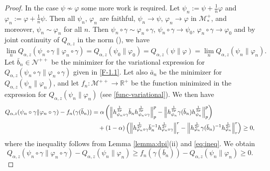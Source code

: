 \documentclass[12pt]{article}
\theoremstyle{definition}
\theoremstyle{remark}
\numberwithin{equation}{section}
\def\Me{\mathcal M}
\def\Ne{\mathcal N}
\def\ffi{\varphi}
\begin{document}
\begin{proof}
In the case $\psi\not\sim \ffi$ some more work is required. Let $\psi_n:=\psi+\frac1n \ffi$ and
$\ffi_n:=\ffi+\frac1n \psi$. Then all $\psi_n$, $\ffi_n$ are faithful,  $\psi_n\to \psi$, $\ffi_n\to \ffi$ in
$\Me_*^+$, {\color{red}and} moreover,  $\psi_n\sim \ffi_n$ for all $n$. Then
$\psi_n\circ\gamma\sim \ffi_n\circ\gamma$, $\psi_n\circ\gamma\to \psi_0$,
$\ffi_n \circ \gamma\to \ffi_0$ and by joint continuity of $Q_{\alpha,z}$ {\color{red}in the norm}
(\cite[Theorem 1(iv)]{kato2023onrenyi}), we have
\[
\lim_n
Q_{\alpha,z}(\psi_n\circ\gamma\|\ffi_n\circ\gamma)=Q_{\alpha,z}(\psi_0\|\ffi_0)
=Q_{\alpha,z}(\psi\|\ffi)=\lim_nQ_{\alpha,z}(\psi_n\|\ffi_n).
\]
Let $\bar b_{n}\in \Ne^{++}$ be the minimizer for the variational expression for
$Q_{\alpha,z}(\psi_n\circ\gamma\|\ffi_n\circ\gamma)$ {\color{red}given in \eqref{F-1.1}.}
Let also $\bar a_n$ be the minimizer for $Q_{\alpha,z}(\psi_n\|\ffi_n)$, and let
$f_n:\Me^{++}\to \mathbb R^+$ be the function minimized in the expression for
$Q_{\alpha,z}(\psi_n\|\ffi_n)$ {\color{red}(see \eqref{func-variational}).} We then have 
\begin{align*}
Q_{\alpha,z}(\psi_n\circ\gamma\|\ffi_n\circ\gamma)-f_n(\gamma(\bar
b_{n}))&=\alpha\left(\Big\|h_{\psi_n\circ\gamma}^{\frac1{2p}}\bar b_{n}
h_{\psi_n\circ\gamma}^{\frac1{2p}}\Big\|_p^p-\Big\|h_{\psi_n}^{1\over 2p}\gamma(\bar
b_n)h_{\psi_n}^{1\over 2p}\Big\|_p^p\right)\\
&\quad + (1-\alpha)\left(\Big\|h_{\ffi_n\circ\gamma}^{\frac1{2r}}\bar b_{n}^{-1}
h_{\ffi_n\circ\gamma}^{\frac1{2r}}\Big\|_r^r-\Big\|h_{\ffi_n}^{1\over 2r}\gamma(\bar
b_n)^{-1}h_{\ffi_n}^{1\over 2r}\Big\|_r^r\right)\ge 0,
\end{align*}
where the inequality follows from Lemma \ref{lemma:dpi}(ii) and \eqref{eq:ineq}. We
obtain
\begin{equation}\label{eq:qfn}
Q_{\alpha,z}(\psi_n\circ\gamma\|\ffi_n\circ\gamma)-Q_{\alpha,z}(\psi_n\|\ffi_n)\ge f_n(\gamma(\bar
b_{n}))-Q_{\alpha,z}(\psi_n\|\ffi_n)\ge 0.
\end{equation}


\end{proof}
\end{document}
